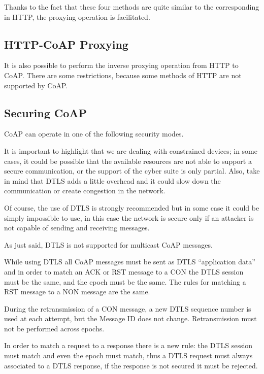 	
	
	Thanks to the fact that these four methods are quite similar to the corresponding in HTTP, the proxying operation is facilitated.
	
	\subsection{HTTP-CoAP Proxying}
	It is also possible to perform the inverse proxying operation from HTTP to CoAP.\newline
	There are some restrictions, because some methods of HTTP are not supported by CoAP.
	
	
	
	\subsection{Securing CoAP}
	CoAP can operate in one of the following security modes.
	
	
	
	It is important to highlight that we are dealing with constrained devices; in some cases, it could be possible that the available resources are not able to support a secure communication, or the support of the cyber suite is only partial.\newline
	Also, take in mind that DTLS adds a little overhead and it could slow down the communication or create congestion in the network.
	
	Of course, the use of DTLS is strongly recommended but in some case it could be simply impossible to use, in this case the network is secure only if an attacker is not capable of sending and receiving messages.
	
	As just said, DTLS is not supported for multicast CoAP messages.
	
	While using DTLS all CoAP messages must be sent as DTLS “application data” and in order to match an ACK or RST message to a CON the DTLS session must be the same, and the epoch must be the same.\newline
	The rules for matching a RST message to a NON message are the same.
	
	During the retransmission of a CON message, a new DTLS sequence number is used at each attempt, but the Message ID does not change.\newline
	Retransmission must not be performed across epochs.
	
	In order to match a request to a response there is a new rule: the DTLS session must match and even the epoch must match, thus a DTLS request must always associated to a DTLS response, if the response is not secured it must be rejected.
	

